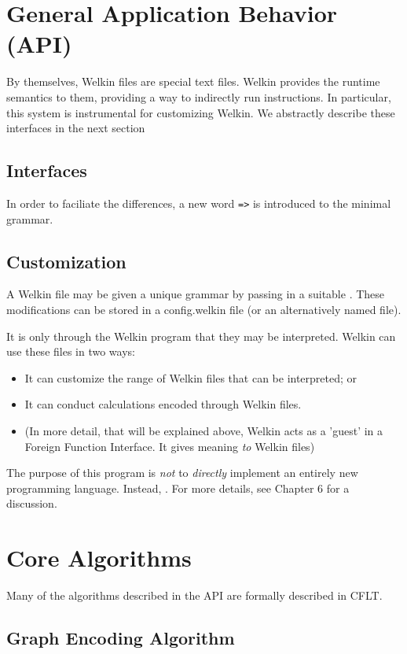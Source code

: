 \section{General Application Behavior (API)}
By themselves, Welkin files are special text files. Welkin provides the runtime semantics to them, providing a way to indirectly run instructions. In particular, this system is instrumental for customizing Welkin. We abstractly describe these interfaces in the next section


\subsection{Interfaces}


In order to faciliate the differences, a new word \texttt{=>} is introduced to the minimal grammar.

\subsection{Customization}
A Welkin file may be given a unique grammar by passing in a suitable . These modifications can be stored in a config.welkin file (or an alternatively named file).






It is only through the Welkin program that they may be interpreted. Welkin can use these files in two ways:
\begin{itemize}
	\item It can customize the range of Welkin files that can be interpreted; or
	\item It can conduct calculations encoded through Welkin files.
	\item (In more detail, that will be explained above, Welkin acts as a 'guest' in a Foreign Function Interface. It gives meaning \textit{to} Welkin files)
\end{itemize}


The purpose of this program is \textit{not} to \textit{directly} implement an entirely new programming language. Instead, . For more details, see Chapter 6 for a discussion.


\section{Core Algorithms}
Many of the algorithms described in the API are formally described in CFLT.
\subsection{Graph Encoding Algorithm}

\subsection{}




\label{ch:spec}
